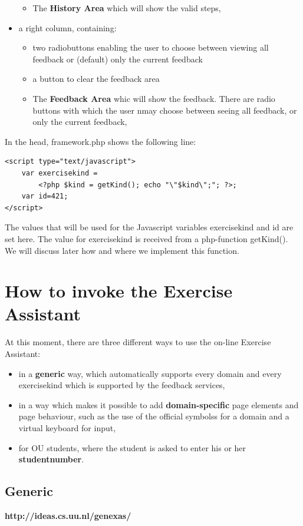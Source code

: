 \documentclass{article}
\begin{document}
\begin{itemize}
\begin{itemize}
	\item The \textbf{History Area} which will show the valid steps,
	\end{itemize}
\item a right column, containing:
	\begin{itemize}
	\item two radiobuttons enabling the user to choose between viewing all feedback or (default) only the
	current feedback
	\item a button to clear the feedback area
	\item The \textbf{Feedback Area} whic will show the feedback. There are radio buttons with which the user nmay choose between seeing all feedback, or only the current feedback,
		\end{itemize}

\end{itemize}

In the head, framework.php shows the following line:
\begin{verbatim}
<script type="text/javascript">
    var exercisekind = 
        <?php $kind = getKind(); echo "\"$kind\";"; ?>; 
    var id=421;
</script>
\end{verbatim}
The values that will be used for the Javascript variables exercisekind and id are set here. The value for 
exercisekind is received from a php-function getKind(). We will discuss later how and where we implement this function.

\section{How to invoke the Exercise Assistant}
At this moment, there are three different ways to use the on-line Exercise Assistant: 
\begin{itemize}
\item in a \textbf{generic} way, which automatically supports every domain and every exercisekind 
which is supported by the feedback services, 
\item in a way which makes it possible to add \textbf{domain-specific} page elements and page behaviour, 
such as the use of the official symbolss for a domain and a virtual keyboard for input,
\item for OU students, where the student is asked to enter his or her \textbf{studentnumber}.
\end{itemize}

\subsection{Generic}
\textbf{http://ideas.cs.uu.nl/genexas/} 
\end{document}
